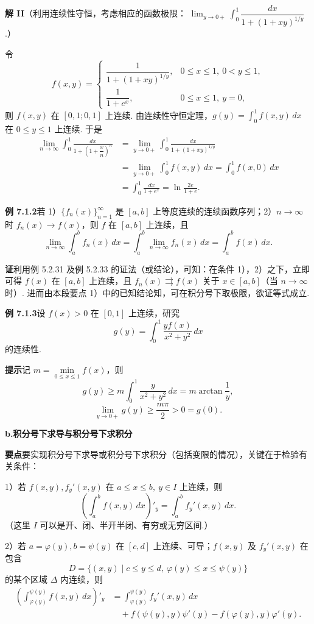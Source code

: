 \documentclass[UTF8, 12pt, fontset=fandol, oneside]{ctexart}
\begin{document}
\noindent\textbf{解 II}\quad （利用连续性守恒，考虑相应的函数极限：
$\displaystyle\lim_{y\to0+}\int_0^1\dfrac{dx}{1+(1+xy)^{1/y}}$.）

令
\[
f(x,y)=
\begin{cases}
\dfrac1{1+(1+xy)^{1/y}}, & 0\le x\le1,\ 0<y\le1,\\[0.8em]
\dfrac1{1+e^x}, & 0\le x\le1,\ y=0,
\end{cases}
\]
则 $f(x,y)$ 在 $[0,1;0,1]$ 上连续. 由连续性守恒定理，$g(y)=\displaystyle\int_0^1f(x,y)\,dx$ 在 $0\le y\le1$ 上连续. 于是
\[
\begin{aligned}
\lim_{n\to\infty}\int_0^1\frac{dx}{1+\left(1+\dfrac{x}{n}\right)^n}
&=\lim_{y\to0+}\int_0^1\frac{dx}{1+(1+xy)^{1/y}}\\
&=\lim_{y\to0+}\int_0^1f(x,y)\,dx
=\int_0^1f(x,0)\,dx\\
&=\int_0^1\frac{dx}{1+e^x}
=\ln\frac{2e}{1+e}.
\end{aligned}
\]

\noindent\textbf{例 7.1.2}\quad 若 1）$\{f_n(x)\}_{n=1}^{\infty}$ 是 $[a,b]$ 上等度连续的连续函数序列；2）$n\to\infty$ 时 $f_n(x)\to f(x)$，则 $f$ 在 $[a,b]$ 上连续，且
\[
\lim_{n\to\infty}\int_a^b f_n(x)\,dx
=\int_a^b \lim_{n\to\infty}f_n(x)\,dx
=\int_a^b f(x)\,dx.
\]

\noindent\textbf{证}\quad 利用例 5.2.31 及例 5.2.33 的证法（或结论），可知：在条件 1），2）之下，立即可得 $f(x)$ 在 $[a,b]$ 上连续，且 $f_n(x)\rightrightarrows f(x)$ 关于 $x\in[a,b]$（当 $n\to\infty$ 时）. 进而由本段要点 1）中的已知结论知，可在积分号下取极限，欲证等式成立.

\noindent\textbf{例 7.1.3}\quad 设 $f(x)>0$ 在 $[0,1]$ 上连续，研究
\[
g(y)=\int_0^1\frac{yf(x)}{x^2+y^2}\,dx
\]
的连续性.

\noindent\textbf{提示}\quad 记 $m=\min\limits_{0\le x\le1}f(x)$，则
\[
g(y)\ge m\int_0^1\frac{y}{x^2+y^2}\,dx=m\arctan\frac1y,
\]
\[
\lim_{y\to0+}g(y)\ge\frac{m\pi}{2}>0=g(0).
\]

\noindent\textbf{b.\quad 积分号下求导与积分号下求积分}

\noindent\textbf{要点}\quad 要实现积分号下求导或积分号下求积分（包括变限的情况），关键在于检验有关条件：

1）若 $f(x,y),f_y'(x,y)$ 在 $a\le x\le b,\ y\in I$ 上连续，则
\[
\left(\int_a^b f(x,y)\,dx\right)'_y=\int_a^b f_y'(x,y)\,dx.
\]
（这里 $I$ 可以是开、闭、半开半闭、有穷或无穷区间.）

2）若 $a=\varphi(y), b=\psi(y)$ 在 $[c,d]$ 上连续、可导；$f(x,y)$ 及 $f_y'(x,y)$ 在包含
\[
D=\{(x,y)\mid c\le y\le d,\ \varphi(y)\le x\le\psi(y)\}
\]
的某个区域 $\Delta$ 内连续，则
\[
\begin{aligned}
\left(\int_{\varphi(y)}^{\psi(y)}f(x,y)\,dx\right)'_y
&=\int_{\varphi(y)}^{\psi(y)}f_y'(x,y)\,dx\\
&\quad+f(\psi(y),y)\psi'(y)-f(\varphi(y),y)\varphi'(y).
\end{aligned}
\]
\end{document}

